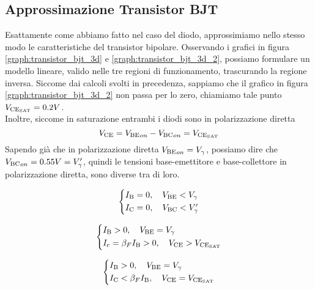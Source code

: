 \documentclass[../elettronica]{subfiles}
\begin{document}
\subsection{Approssimazione Transistor BJT}
Esattamente come abbiamo fatto nel caso del diodo, approssimiamo nello stesso modo le caratteristiche del transistor bipolare.
Osservando i grafici in figura \ref{graph:transistor_bjt_3d} e \ref{graph:transistor_bjt_3d_2}, possiamo formulare un modello
lineare, valido nelle tre regioni di funzionamento, trascurando la regione inversa.
Siccome dai calcoli svolti in precedenza, sappiamo che il grafico in figura \ref{graph:transistor_bjt_3d_2} non passa per lo zero,
chiamiamo tale punto $V_{\text{CE}_{\text{SAT}}} = 0.2 V$.
\\[1em]
Inoltre, siccome in saturazione entrambi i diodi sono in polarizzazione diretta
\[
    V_{\text{CE}} = {V_{\text{BE}}}_{on} - {V_{\text{BC}}}_{on} = V_{\text{CE}_{\text{SAT}}}
\]
Sapendo già che in polarizzazione diretta ${V_{\text{BE}}}_{on} = V_\gamma$, possiamo dire che ${V_{\text{BC}}}_{on} = 0.55 V = V_\gamma'$, quindi le tensioni
base-emettitore e base-collettore in polarizzazione diretta, sono diverse tra di loro.
\\[1em]
\begin{minipage}{.49\textwidth}
    \begin{tcolorbox}[title=OFF, width=\textwidth]
        \[\begin{cases*}
            \I{B} = 0 ,\quad \vbe < V_\gamma\\
            \I{C} = 0 ,\quad \vbc < V_\gamma'
        \end{cases*}\]
    \end{tcolorbox}
\end{minipage}
\begin{minipage}{.50\textwidth}
    \begin{tcolorbox}[title=AD, width=\textwidth]
        \[\begin{cases*}
            \I{B} > 0 ,\quad \V{BE} = V_\gamma\\
            \I{c} = \beta_F \I{B} > 0, \quad \vce > \vcesat
        \end{cases*}\]
    \end{tcolorbox}
\end{minipage}
\begin{tcolorbox}[title=SAT]
    \[\begin{cases*}
        \I{B}> 0, \quad \vbe = V_\gamma\\
        \I{C} < \beta_F \I{B} , \quad \vce = \vcesat
    \end{cases*}\]
\end{tcolorbox}
\end{document}
